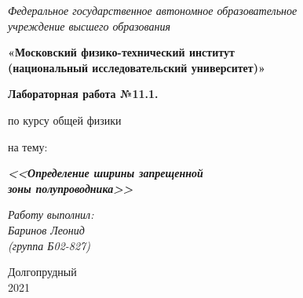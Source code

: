 \thispagestyle{empty}
\begin{center}
    \textit{Федеральное государственное автономное образовательное\\ учреждение высшего образования }

    \vspace{0.5ex}

        \textbf{«Московский физико-технический институт\\ (национальный исследовательский университет)»}
\end{center}

\vspace{10ex}

\begin{center}
    \vspace{13ex}

    \textbf{Лабораторная работа №11.1.}

    \vspace{1ex}

    по курсу общей физики

    на тему:

    \textbf{\textit{<<Определение ширины запрещенной\\ зоны
    полупроводника>>}}

    \vspace{30ex}

    \begin{flushright}
        \noindent
        \textit{Работу выполнил:}\\  
        \textit{Баринов Леонид \\(группа Б02-827)}
    \end{flushright}
    \vfill
    Долгопрудный \\2021
\newpage
\setcounter{page}{1}
\fancyhead[R]{\nouppercase{\leftmark}}	
\end{center}
